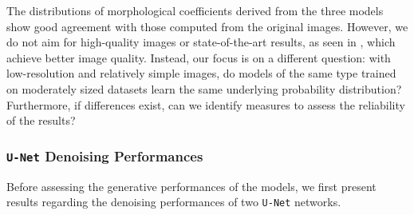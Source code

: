 \documentclass[fleqn,usenatbib]{mnras}
\begin{document}
The distributions of morphological coefficients derived from the three models show good agreement with those computed from the original images. However, we do not aim for high-quality images or state-of-the-art results, as seen in \citep{ravanbakhsh2016, Fussell2019, Lanusse2021, smith2021, HACKSTEIN2023100685}, which achieve better image quality. Instead, our focus is on a different question: with low-resolution and relatively simple images, do models of the same type trained on moderately sized datasets learn the same underlying probability distribution? Furthermore, if differences exist, can we identify measures to assess the reliability of the results?
%
\subsubsection{\texttt{U-Net} Denoising Performances}
\label{sec-UNet-Perf}
%
Before assessing the generative performances of the models, we first present results regarding the denoising performances of two \texttt{U-Net} networks.
\end{document}
